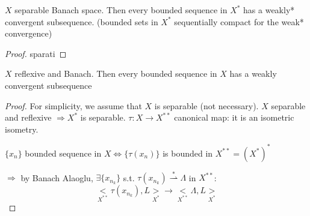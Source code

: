     \begin{theorem}
        \(X \) separable Banach space. Then every bounded sequence in \(X^*\) has a weakly* convergent subsequence. (bounded sets in \(X^* \) sequentially compact for the weak* convergence)
    \end{theorem}

    \begin{proof}
        sparati
    \end{proof}

    \begin{theorem}
        \(X\) reflexive and Banach. Then every bounded sequence in \(X\) has a weakly convergent subsequence
    \end{theorem}

    \begin{proof}
        For simplicity, we assume that \(X\) is separable (not necessary). \(X \) separable and reflexive \(\Rightarrow X^*\) is separable. \(\tau:X \to X^{**}\) canonical map: it is an isometric isometry.

        \(\{x_n\}\) bounded sequence in \(X \iff \{ \tau(x_n) \}\) is bounded in \(X^{**} = (X^*)^*\)
        
        \(\Rightarrow \) by Banach Alaoglu, \(\exists \{x_{n_k}\}\) s.t. \(\tau(x_{n_k}) \overset{*}{\rightharpoonup} \Lambda \) in \(X^{**}\):
        \[
            \underset{X^{**}}{<}\tau(x_{n_k}), L \underset{X^*}{>} \to \underset{X^{**}}{<}\Lambda, L \underset{X^*}{>}
        \]
    \end{proof}

